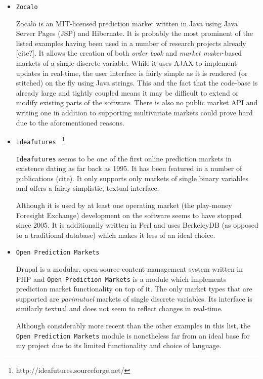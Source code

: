 \documentclass[bsc,frontabs,twoside,singlespacing,parskip,deptreport]{infthesis}     %
\begin{document}
\begin{itemize}

\item {\tt Zocalo}

    Zocalo is an MIT-licensed prediction market written in Java using Java Server Pages (JSP) and Hibernate. It is probably the most prominent of the listed examples having been used in a number of research projects already [cite?]. It allows the creation of both {\em order book} and {\em market maker}-based markets of a single discrete variable. While it uses AJAX to implement updates in real-time, the user interface is fairly simple as it is rendered (or stitched) on the fly using Java strings. This and the fact that the code-base is already large and tightly coupled means it may be difficult to extend or modify existing parts of the software. There is also no public market API and writing one in addition to supporting multivariate markets could prove hard due to the aforementioned reasons.

\item {\tt ideafutures } \footnote{http://ideafutures.sourceforge.net/}

    {\tt Ideafutures} seems to be one of the first online prediction markets in existence dating as far back as 1995. It has been featured in a number of publications (cite). It only supports only markets of single binary variables and offers a fairly simplistic, textual interface.

Although it is used by at least one operating market (the play-money Foresight Exchange) development on the software seems to have stopped since 2005. It is additionally written in Perl and uses BerkeleyDB (as opposed to a traditional database) which makes it less of an ideal choice.

\item {\tt Open Prediction Markets}

    Drupal is a modular, open-source content management system written in PHP and {\tt Open Prediction Markets} is a module which implements prediction market functionality on top of it. The only market types that are  supported are {\em parimutuel} markets of single discrete variables. Its interface is similarly textual and does not seem to reflect changes in real-time.
    
    Although considerably more recent than the other examples in this list, the {\tt Open Prediction Markets} module is nonetheless far from an ideal base for my project due to its limited functionality and choice of language.
    
\end{itemize}
\end{document}
